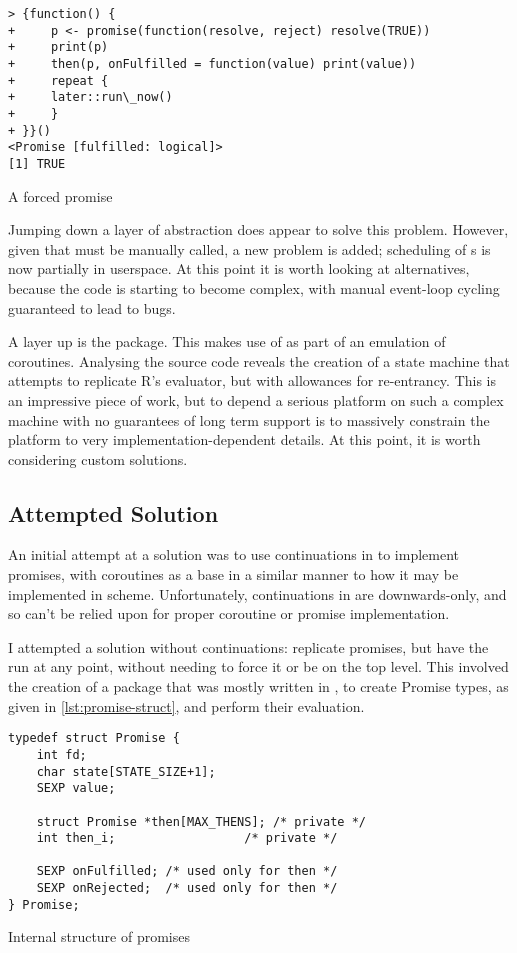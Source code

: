 \begin{listing}
\begin{verbatim}
> {function() {
+     p <- promise(function(resolve, reject) resolve(TRUE))
+     print(p)
+     then(p, onFulfilled = function(value) print(value))
+     repeat {
+     later::run\_now()
+     }
+ }}()
<Promise [fulfilled: logical]>
[1] TRUE
\end{verbatim}
\caption{A forced promise}
\label{lst:promise-forced}
\end{listing}

Jumping down a layer of abstraction does appear to solve this problem.
However, given that  must be manually called, a new problem is added; scheduling of s is now partially in userspace.
At this point it is worth looking at alternatives, because the code is starting to become complex, with manual event-loop cycling guaranteed to lead to bugs.

A layer up is the  package\cite{henry21coro}.
This makes use of  as part of an emulation of coroutines.
Analysing the source code reveals the creation of a state machine that attempts to replicate R's evaluator, but with allowances for re-entrancy.
This is an impressive piece of work, but to depend a serious platform on such a complex machine with no guarantees of long term support is to massively constrain the platform to very implementation-dependent details.
At this point, it is worth considering custom solutions.

\subsection{Attempted Solution}

An initial attempt at a solution was to use continuations in \R to implement promises, with coroutines as a base in a similar manner to how it may be implemented in scheme.
Unfortunately, continuations in \R are downwards-only, and so can't be relied upon for proper coroutine or promise implementation.

I attempted a solution without continuations: replicate promises, but have the  run at any point, without needing to force it or be on the top level.
This involved the creation of a package that was mostly written in , to create Promise types, as given in \cref{lst:promise-struct}, and perform their evaluation.

\begin{listing}
\begin{verbatim}
typedef struct Promise {
    int fd;
    char state[STATE_SIZE+1];
    SEXP value;

    struct Promise *then[MAX_THENS]; /* private */
    int then_i;		             /* private */

    SEXP onFulfilled; /* used only for then */
    SEXP onRejected;  /* used only for then */
} Promise;
\end{verbatim}
\caption{Internal structure of promises}
\label{lst:promise-struct}
\end{listing}

